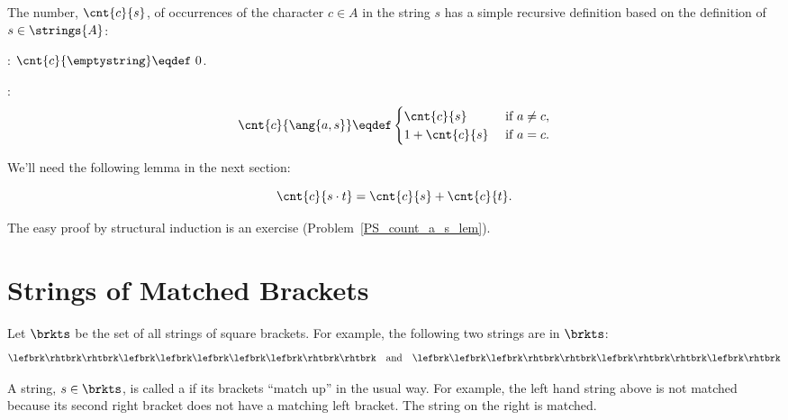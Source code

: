 The number, $\cnt{c}{s}$, of occurrences of the character $c \in A$ in
the string $s$ has a simple recursive definition based on the
definition of $s \in \strings{A}$:
\begin{definition}\label{countas_def} \mbox{}

: $\cnt{c}{\emptystring} \eqdef\ 0$.

:
\[
\cnt{c}{\ang{a,s}} \eqdef \begin{cases}
                           \cnt{c}{s}  &\text{ if } a \neq c,\\
                           1 + \cnt{c}{s} &\text{ if } a = c.
                           \end{cases}
\]

\end{definition}

We'll need the following lemma in the next section:
\begin{lemma}\label{countas_lem}
\[
\cnt{c}{s \cdot t} = \cnt{c}{s} + \cnt{c}{t}.
\]
\end{lemma}
The easy proof by structural induction is an exercise
(Problem~\ref{PS_count_a_s_lem}).

\begin{problems}
\classproblems
{}

\homeworkproblems
{}

\examproblems
{}

\end{problems}

\section{Strings of Matched Brackets}

Let $\brkts$ be the set of all strings of square brackets.  For example,
the following two strings are in $\brkts$:
\begin{equation}\label{2strings}
\lefbrk\rhtbrk\rhtbrk\lefbrk\lefbrk\lefbrk\lefbrk\lefbrk\rhtbrk\rhtbrk\quad \text{and}\quad \lefbrk\lefbrk\lefbrk\rhtbrk\rhtbrk\lefbrk\rhtbrk\rhtbrk\lefbrk\rhtbrk
\end{equation}

A string, $s \in \brkts$, is called a  if its
brackets ``match up'' in the usual way.  For example, the left hand
string above is not matched because its second right bracket does not
have a matching left bracket.  The string on the right is matched.

